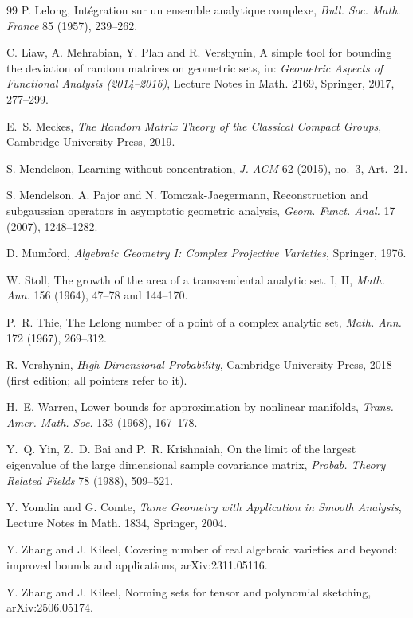 \documentclass[11pt]{article}
\theoremstyle{definition}
\numberwithin{equation}{section}
\begin{document}
\begin{thebibliography}{99}
P. Lelong, Int\'egration sur un ensemble analytique complexe, \emph{Bull. Soc. Math. France} 85 (1957), 239--262.

C. Liaw, A. Mehrabian, Y. Plan and R. Vershynin, A simple tool for bounding the deviation of random matrices on geometric sets, in: \emph{Geometric Aspects of Functional Analysis (2014--2016)}, Lecture Notes in Math. 2169, Springer, 2017, 277--299.

E.~S. Meckes, \emph{The Random Matrix Theory of the Classical Compact Groups}, Cambridge University Press, 2019.

S. Mendelson, Learning without concentration, \emph{J. ACM} 62 (2015), no.~3, Art.~21.

S. Mendelson, A. Pajor and N. Tomczak-Jaegermann, Reconstruction and subgaussian operators in asymptotic geometric analysis, \emph{Geom. Funct. Anal.} 17 (2007), 1248--1282.

D. Mumford, \emph{Algebraic Geometry I: Complex Projective Varieties}, Springer, 1976.

W. Stoll, The growth of the area of a transcendental analytic set. I, II, \emph{Math. Ann.} 156 (1964), 47--78 and 144--170.

P.~R. Thie, The Lelong number of a point of a complex analytic set, \emph{Math. Ann.} 172 (1967), 269--312.

R. Vershynin, \emph{High-Dimensional Probability}, Cambridge University Press, 2018 (first edition; all pointers refer to it).

H.~E. Warren, Lower bounds for approximation by nonlinear manifolds, \emph{Trans. Amer. Math. Soc.} 133 (1968), 167--178.

Y.~Q. Yin, Z.~D. Bai and P.~R. Krishnaiah, On the limit of the largest eigenvalue of the large dimensional sample covariance matrix, \emph{Probab. Theory Related Fields} 78 (1988), 509--521.

Y. Yomdin and G. Comte, \emph{Tame Geometry with Application in Smooth Analysis}, Lecture Notes in Math. 1834, Springer, 2004.

Y. Zhang and J. Kileel, Covering number of real algebraic varieties and beyond: improved bounds and applications, arXiv:2311.05116.

Y. Zhang and J. Kileel, Norming sets for tensor and polynomial sketching, arXiv:2506.05174.

\end{thebibliography}
\end{document}
